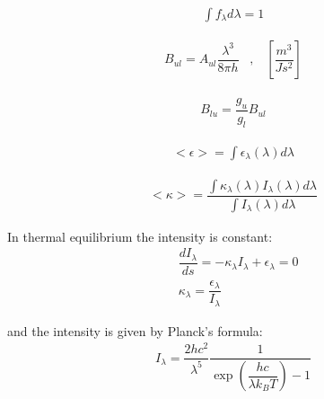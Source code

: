 \begin{align}
\int f_{\lambda} d\lambda = 1
\end{align}

\begin{align}
B_{ul} = A_{ul} \dfrac{\lambda^3}{8 \pi h} \;\;\; , \;\;\; \left[\dfrac{m^3}{J s^2}\right]
\end{align}

\begin{align}
B_{lu} = \dfrac{g_u}{g_l} B_{ul}
\end{align}

\begin{align}
<\epsilon> = \int \epsilon_{\lambda}(\lambda) d\lambda
\end{align}

\begin{align}
<\kappa> = \dfrac{\int \kappa_{\lambda}(\lambda) I_{\lambda}(\lambda) d\lambda}{\int I_{\lambda}(\lambda) d\lambda}
\end{align}

In thermal equilibrium the intensity is constant:
\begin{align}
&\dfrac{d I_{\lambda}}{ds} = - \kappa_\lambda I_{\lambda} + 	\epsilon_\lambda = 0 \\
&\kappa_\lambda = \dfrac{\epsilon_\lambda}{I_{\lambda}}
\end{align}

and the intensity is given by Planck's formula:
\begin{align}
I_\lambda = \dfrac{2 h c^2}{\lambda^5} \dfrac{1}{\exp\left(\dfrac{h c}{\lambda k_B T}\right) - 1}
\end{align}

